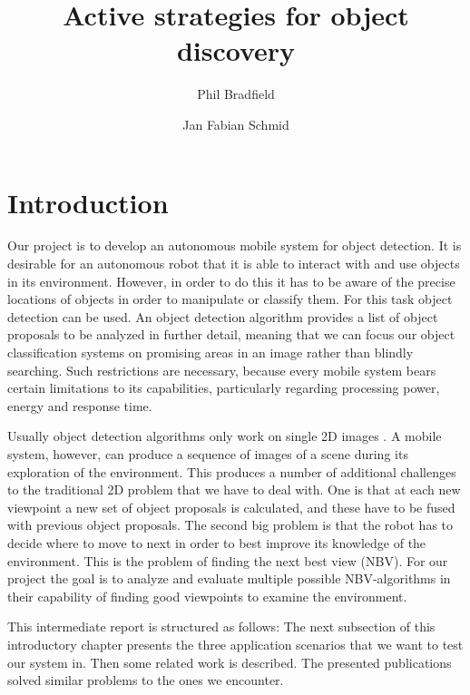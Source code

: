 \documentclass[a4paper,11pt,english]{article}
\begin{document}
\title{Active strategies for object discovery}
\author{Phil Bradfield \and Jan Fabian Schmid}
	
\maketitle 

\section{Introduction}
Our project is to develop an autonomous mobile system for object detection.
It is desirable for an autonomous robot that it is able to interact with and use objects in its environment.
However, in order to do this it has to be aware of the precise locations of objects in order to manipulate or classify them.
For this task object detection can be used.
An object detection algorithm provides a list of object proposals to be analyzed in further detail, meaning that we can focus our object classification systems on promising areas in an image rather than blindly searching.
Such restrictions are necessary, because every mobile system bears certain limitations to its capabilities, particularly regarding processing power, energy and response time.

Usually object detection algorithms only work on single 2D images \cite{atanasov2014nonmyopic}.
A mobile system, however, can produce a sequence of images of a scene during its exploration of the environment.
This produces a number of additional challenges to the traditional 2D problem that we have to deal with.
One is that at each new viewpoint a new set of object proposals is calculated, and these have to be fused with previous object proposals.
The second big problem is that the robot has to decide where to move to next in order to best improve its knowledge of the environment.
This is the problem of finding the next best view (NBV). 
For our project the goal is to analyze and evaluate multiple possible NBV-algorithms in their capability of finding good viewpoints to examine the environment.\medskip

This intermediate report is structured as follows:
The next subsection of this introductory chapter presents the three application scenarios that we want to test our system in.
Then some related work is described.
The presented publications solved similar problems to the ones we encounter.
\end{document}
